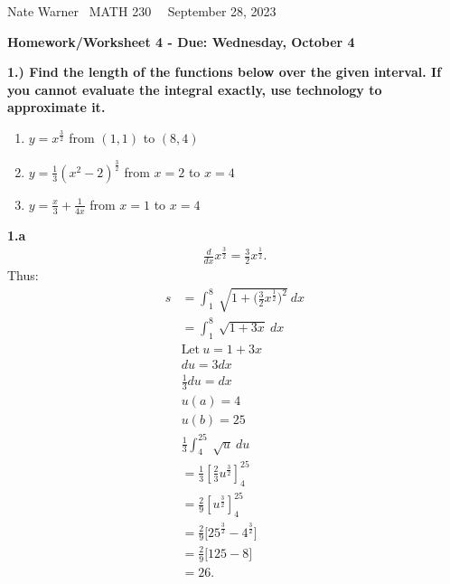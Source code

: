 \documentclass{report}
\title{\Huge{}}
\author{\huge{Nathan Warner}}
\date{\huge{}}
\begin{document}
    \pagebreak \bigbreak \noindent
    Nate Warner \ \quad \quad \quad \quad \quad \quad \quad \quad \quad \quad \quad \quad \quad \quad \quad \quad \quad  MATH 230 \quad  \quad \quad \quad \quad \quad \quad \quad \quad \ \ \quad \quad September 28, 2023
    \begin{center}
        \textbf{Homework/Worksheet 4 - Due: Wednesday, October 4}
    \end{center}
    \bigbreak \noindent 
    \begin{mdframed}
        \textbf{1.) Find the length of the functions below over the given interval. If you cannot evaluate the integral exactly, use technology to approximate it.}
        \bigbreak \noindent 
            \begin{enumerate}[label=(\alph*)]
               \item \(y = x^{\frac{3}{2}}\) from \((1, 1)\) to \((8, 4)\)
                \item \(y = \frac{1}{3}(x^2 - 2)^{\frac{3}{2}}\) from \(x = 2\) to \(x = 4\)
                \item \(y = \frac{x}{3} + \frac{1}{4x}\) from \(x = 1\) to \(x = 4\) 
            \end{enumerate}
    \end{mdframed}

    \bigbreak \noindent 
    \textbf{1.a}
    \bigbreak \noindent 
        \begin{align*}
            \frac{d}{dx}x^{\frac{3}{2}} = \frac{3}{2}x^{\frac{1}{2}}
        .\end{align*}
    Thus:
    \begin{align*}
        s &= \int_{1}^{8}\ \sqrt{1+\bigg(\frac{3}{2}x^{\frac{1}{2}}\bigg)^{2}}\ dx \\
          &= \int_{1}^{8}\ \sqrt{1+3x}\ dx \\
          &\text{Let}\ u=1+3x \\
          &du = 3dx \\
          &\frac{1}{3}du=dx \\
          &u(a) = 4 \\
          &u(b) = 25 \\
          &\frac{1}{3}\int_{4}^{25}\ \sqrt{u}\ du \\
          &=\frac{1}{3}\left[\frac{2}{3}u^{\frac{3}{2}}\right]_4^{25} \\
          &=\frac{2}{9}\left[u^{\frac{3}{2}}\right]^{25}_4 \\
          &=\frac{2}{9}\bigg[25^{\frac{3}{2}}-4^{\frac{3}{2}}\bigg] \\
          &=\frac{2}{9}\bigg[125-8\bigg] \\
          &=26
    .\end{align*}
\end{document}

